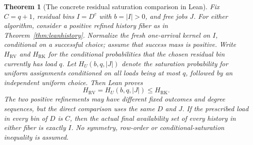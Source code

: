\documentclass[11pt]{article}
\newtheorem{theorem}{Theorem}
\begin{document}
\begin{theorem}[The concrete residual saturation comparison in Lean]\label{thm:leanrows}
Fix $C=q+1$, residual bins $I=D^c$ with $b=|I|>0$, and free jobs $J$.
For either algorithm, consider a positive refined history fiber as in
Theorem~\ref{thm:leanhistory}. Normalize the fresh one-arrival kernel on
$I$, conditional on a successful choice; assume that success mass is
positive. Write $H_{\mathrm{RV}}$ and $H_{\mathrm{RK}}$ for the conditional
probabilities that the chosen residual bin currently has load $q$.
Let $H_U(b,q,|J|)$ denote the saturation probability for uniform
assignments conditioned on all loads being at most $q$, followed by an
independent uniform choice. Then Lean proves
\[
 H_{\mathrm{RV}}=H_U(b,q,|J|)\leq H_{\mathrm{RK}}.
\]
The two positive refinements may have different fixed outcomes and degree
sequences, but the direct comparison uses the same $D$ and $J$.
If the prescribed load in every bin of $D$ is $C$, then the actual final
availability set of every history in either fiber is exactly $I$.
No symmetry, row-order or conditional-saturation inequality is assumed.
\end{theorem}
\end{document}
